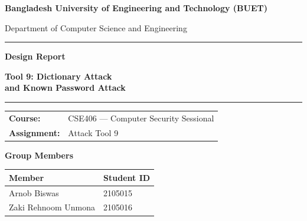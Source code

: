 \documentclass[11pt]{article}
\begin{document}
\begin{titlepage}
\centering
\vspace*{1.2cm}
{\large\bfseries Bangladesh University of Engineering and Technology (BUET)\par}
\vspace{0.25cm}
{\large Department of Computer Science and Engineering\par}

\vspace{2.2cm}
{\color{steel}\rule{0.82\textwidth}{1.4pt}\par}
\vspace{0.7cm}
{\Huge\bfseries\color{navy} Design Report\par}
\vspace{0.5cm}
{\LARGE\bfseries Tool 9: Dictionary Attack\\[2pt] and Known Password Attack\par}
\vspace{0.7cm}
{\color{steel}\rule{0.82\textwidth}{1.4pt}\par}

\vspace{1.8cm}
{\large
\begin{tabular}{ll}
\textbf{Course:} & CSE406 --- Computer Security Sessional \\
\textbf{Assignment:} & Attack Tool 9 \\
\end{tabular}
\par}

\vfill

{\large\bfseries\color{navy} Group Members\par}
\vspace{0.4cm}
\begin{tabular}{p{6cm}p{2.5cm}}
\toprule
\rowcolor{navy!12}
\textbf{Member} & \textbf{Student ID} \\
\midrule
Arnob Biswas & 2105015 \\[1.2ex]
Zaki Rehnoom Unmona & 2105016 \\
\bottomrule
\end{tabular}

\vspace{1.6cm}
\vspace{1cm}
\end{titlepage}

\tableofcontents
\newpage
{}
\setcounter{page}{1}
\end{document}
